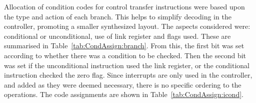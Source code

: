 Allocation of condition codes for control transfer instructions were based upon the type and action of each branch. This helps to simplify decoding in the controller, promoting a smaller synthesized layout. 
The aspects considered were: conditional or unconditional, use of link register and flags used. 
These are summarised in Table~\ref{tab:CondAssign:branch}. 
From this, the first bit was set according to whether there was a condition to be checked. 
Then the second bit was set if the unconditional instruction used the link register, or the conditional instruction checked the zero flag. 
Since interrupts are only used in the controller, and added as they were deemed necessary, there is no specific ordering to the operations. 
The code assignments are shown in Table~\ref{tab:CondAssign:icond}. 

\begin{table}[h!]
\def\arraystretch{1.2}
\centering
\footnotesize
{}
\caption{Condition Code Assignments}
\label{tab:CondAssign}
\end{table}
